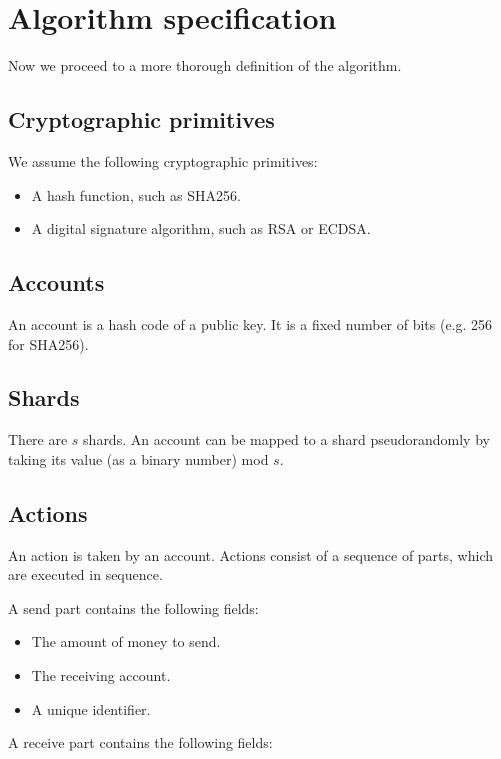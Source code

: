 \documentclass{article}
\begin{document}
\section{Algorithm specification}

Now we proceed to a more thorough definition of the algorithm.

\subsection{Cryptographic primitives}

We assume the following cryptographic primitives:

\begin{itemize}
  \item A hash function, such as SHA256.
  \item A digital signature algorithm, such as RSA or ECDSA.
\end{itemize}

\subsection{Accounts}

An account is a hash code of a public key.  It is a fixed number of bits (e.g. 256 for SHA256).

\subsection{Shards}

There are $s$ shards.  An account can be mapped to a shard pseudorandomly by taking its value (as a binary number) mod $s$.

\subsection{Actions}

An action is taken by an account.  Actions consist of a sequence of parts, which are executed in sequence.

A send part contains the following fields:

\begin{itemize}
  \item The amount of money to send.
  \item The receiving account.
  \item A unique identifier.
\end{itemize}

A receive part contains the following fields:
\end{document}
